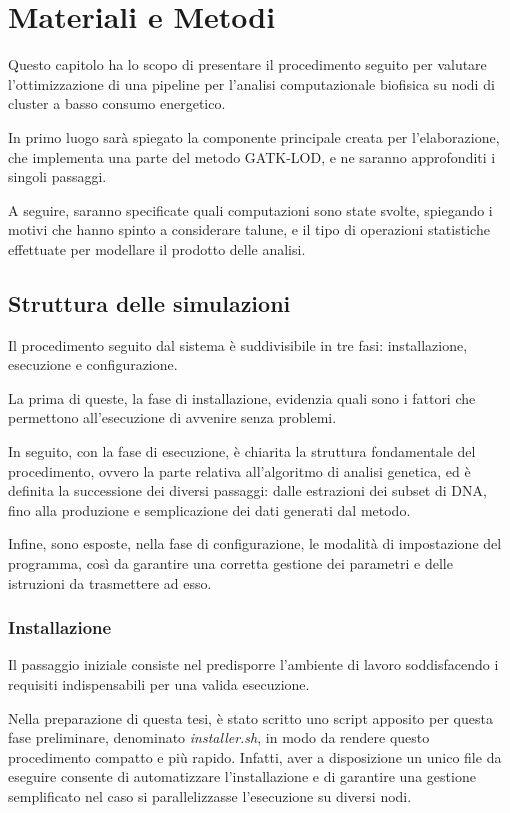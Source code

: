 \chapter{Materiali e Metodi}
Questo capitolo ha lo scopo di presentare il procedimento seguito per valutare l'ottimizzazione di una pipeline per l'analisi computazionale biofisica su nodi di cluster a basso consumo energetico.


In primo luogo sarà spiegato la componente principale creata per l'elaborazione, che implementa una parte del metodo GATK-LOD, e ne saranno approfonditi i singoli passaggi.

A seguire, saranno specificate quali computazioni sono state svolte, spiegando i motivi che hanno spinto a considerare talune, e il tipo di operazioni statistiche effettuate per modellare il prodotto delle analisi.



\section{Struttura delle simulazioni}
Il procedimento seguito dal sistema è suddivisibile in tre fasi: installazione, esecuzione e configurazione.


La prima di queste, la fase di installazione, evidenzia quali sono i fattori che permettono all'esecuzione di avvenire senza problemi.


In seguito, con la fase di esecuzione, è chiarita la struttura fondamentale del procedimento, ovvero la parte relativa all'algoritmo di analisi genetica, ed è definita la successione dei diversi passaggi: dalle estrazioni dei subset di DNA, fino alla produzione e semplicazione dei dati generati dal metodo.


Infine, sono esposte, nella fase di configurazione, le modalità di impostazione del programma, così da garantire una corretta gestione dei parametri e delle istruzioni da trasmettere ad esso.


\subsection{Installazione}
Il passaggio iniziale consiste nel predisporre l'ambiente di lavoro soddisfacendo i requisiti indispensabili per una valida esecuzione.

Nella preparazione di questa tesi, è stato scritto uno script apposito per questa fase preliminare, denominato \textit{installer.sh}, in modo da rendere questo procedimento compatto e più rapido.
Infatti, aver a disposizione un unico file da eseguire consente di automatizzare l'installazione e di garantire una gestione semplificato nel caso si parallelizzasse l'esecuzione su diversi nodi.

